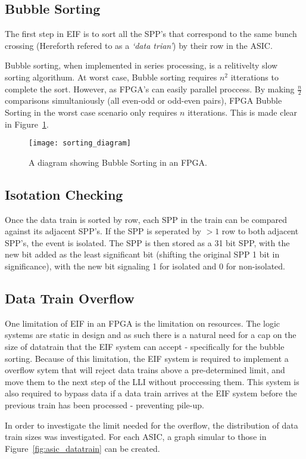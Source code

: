 		\subsection{Bubble Sorting}

		The first step in EIF is to sort all the SPP's that correspond to the same bunch crossing (Hereforth refered to as a \textit{`data trian'}) by their row in the ASIC.
		\par
		Bubble sorting, when implemented in series processing, is a relitivelty slow sorting algorithum.
		At worst case, Bubble sorting requires $n^2$ itterations to complete the sort.
		However, as FPGA's can easily parallel proccess.
		By making $\frac{n}{2}$ comparisons simultaniously (all even-odd or odd-even pairs), FPGA Bubble Sorting in the worst case scenario only requires $n$ itterations. This is made clear in Figure~\ref{fig:sorting}.

		\begin{figure}[ht]
			\centering
			\texttt{[image: sorting\_diagram]}
			\caption{A diagram showing Bubble Sorting in an FPGA.}
			\label{fig:sorting}
		\end{figure}

	\subsection{Isotation Checking}

		Once the data train is sorted by row, each SPP in the train can be compared against its adjacent SPP's.
		If the SPP is seperated by $>1$ row to both adjacent SPP's, the event is isolated.
		The SPP is then stored as a 31 bit SPP, with the new bit added as the least significant bit (shifting the original SPP 1 bit in significance), with the new bit signaling 1 for isolated and 0 for non-isolated. 

	\subsection{Data Train Overflow} %
	\label{sub:data_train_overflow}
		
		One limitation of EIF in an FPGA is the limitation on resources. 
		The logic systems are static in design and as such there is a natural need for a cap on the size of datatrain that the EIF system can accept - specifically for the bubble sorting.
		Because of this limitation, the EIF system is required to implement a overflow sytem that will reject data trains above a pre-determined limit, and move them to the next step of the LLI without proccessing them.
		This system is also required to bypass data if a data train arrives at the EIF system before the previous train has been processed - preventing pile-up.
		\par
		In order to investigate the limit needed for the overflow, the distribution of data train sizes was investigated. For each ASIC, a graph simular to those in Figure~\ref{fig:asic_datatrain} can be created.

